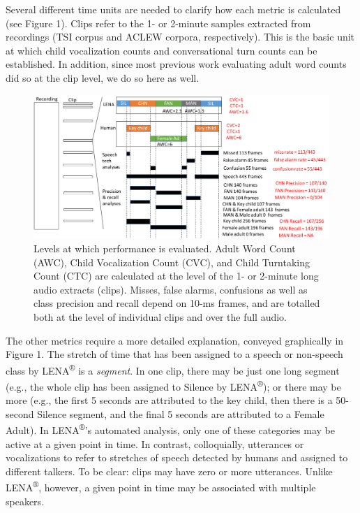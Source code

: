 \documentclass[english,table,man,floatsintext]{apa6}
\begin{document}
Several different time units are needed to clarify how each metric is calculated (see Figure 1). Clips refer to the 1- or 2-minute samples extracted from recordings (TSI corpus and ACLEW corpora, respectively). This is the basic unit at which child vocalization counts and conversational turn counts can be established. In addition, since most previous work evaluating adult word counts did so at the clip level, we do so here as well.

\begin{figure}
\centering
\includegraphics{fig_levels.pdf}
\caption{Levels at which performance is evaluated. Adult Word Count (AWC), Child Vocalization Count (CVC), and Child Turntaking Count (CTC) are calculated at the level of the 1- or 2-minute long audio extracts (clips). Misses, false alarms, confusions as well as class precision and recall depend on 10-ms frames, and are totalled both at the level of individual clips and over the full audio.}
\end{figure}

The other metrics require a more detailed explanation, conveyed graphically in Figure 1. The stretch of time that has been assigned to a speech or non-speech class by LENA\textsuperscript{®} is a \emph{segment}. In one clip, there may be just one long segment (e.g., the whole clip has been assigned to Silence by LENA\textsuperscript{®}); or there may be more (e.g., the first 5 seconds are attributed to the key child, then there is a 50-second Silence segment, and the final 5 seconds are attributed to a Female Adult). In LENA\textsuperscript{®}'s automated analysis, only one of these categories may be active at a given point in time. In contrast, colloquially, utterances or vocalizations to refer to stretches of speech detected by humans and assigned to different talkers. To be clear: clips may have zero or more utterances. Unlike LENA\textsuperscript{®}, however, a given point in time may be associated with multiple speakers.
\end{document}
